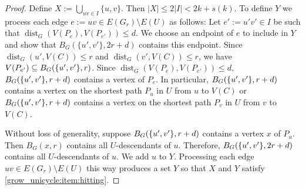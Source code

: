\documentclass{patmorin}
\newcommand{\pat}[1]{\textcolor{Blue}{[Pat: #1]}}
\newcommand{\gwen}[1]{\textcolor{Purple}{Gwen: #1}}
\newcommand{\piotr}[1]{\textcolor{red}{Piotr: #1}}
\DeclareMathOperator{\dist}{dist}
\DeclarePairedDelimiter\set{\{}{\}}
\begin{document}
\begin{proof}
  Define $X:=\bigcup_{uv\in I}\{u,v\}$.  Then $|X|\le 2|I| < 2k+s(k)$.  To define $Y$ we process each edge $e:=uv\in E(G_r)\setminus E(U)$ as follows: Let $e':=u'v'\in I$ be such that $\dist_G(V(P_{e}),V(P_{e'}))\le d$.  We choose an endpoint of $e$ to include in $Y$ and show that $B_G(\{u',v'\}, 2r+d)$ contains this endpoint.
  Since $\dist_G(u',V(C))\leq r$ and $\dist_G(v',V(C))\leq r$,
  we have $V(P_{e'}) \subseteq B_G(\set{u',v'},r)$. Since $\dist_G(V(P_e),V(P_{e'}))\le d$,  $B_G(\set{u',v'},r+d)$ contains a vertex of $P_e$.
  In particular, $B_G(\set{u',v'},r+d)$ contains a vertex on the shortest path $P_u$ in $U$ from $u$ to $V(C)$ or $B_G(\set{u',v'},r+d)$ contains a vertex on the shortest path $P_v$ in $U$ from $v$ to $V(C)$.

  Without loss of generality, suppose $B_G(\set{u',v'},r+d)$ contains a vertex $x$ of $P_u$.  Then $B_G(x,r)$ contains all $U$-descendants of $u$.  Therefore, $B_{G}(\set{u',v'},2r+d)$ contains all $U$-descendants of $u$.  We add $u$ to $Y$. Processing each edge $uv\in E(G_r)\setminus E(U)$ this way produces a set $Y$ so that $X$ and $Y$ satisfy \cref{grow_unicycle:item:hitting}.
\end{proof}
\end{document}
